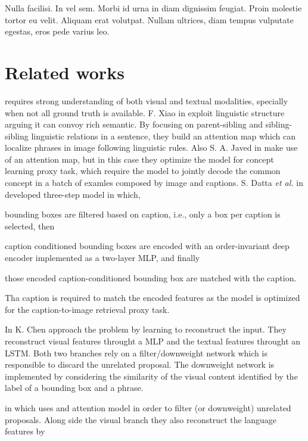 \begin{savequote}[75mm]
Nulla facilisi. In vel sem. Morbi id urna in diam dignissim feugiat. Proin molestie tortor eu velit. Aliquam erat volutpat. Nullam ultrices, diam tempus vulputate egestas, eros pede varius leo.
\end{savequote}

\chapter{Related works}

 requires strong
understanding of both visual and textual modalities, specially when
not all ground truth is available. F. Xiao \etal{} in  exploit linguistic structure arguing it can convoy rich
semantic. By focusing on parent-sibling and sibling-sibling linguistic
relations in a sentence, they build an attention map which can
localize phrases in image following linguistic rules. Also S. A. Javed
\etal{} in  make use of an attention map, but in this
case they optimize the model for concept learning proxy task, which
require the model to jointly decode the common concept in a batch of
examles composed by image and captions. S. Datta \textit{et al.} in
 developed three-step model in which, 
\begin{enumerate*}[label=(\roman*)] 
    \item bounding boxes are filtered based on caption, i.e., only a
    box per caption is selected, then
    \item caption conditioned bounding boxes are encoded with an
    order-invariant deep encoder implemented as a two-layer MLP, and
    finally
    \item those encoded caption-conditioned bounding box are matched
with the caption.
\end{enumerate*}
Tha caption is required to match the encoded features as the model is
optimized for the caption-to-image retrieval proxy task. 

In  K. Chen \etal{} approach the problem by learning to
reconstruct the input. They reconstruct visual features throught a MLP
and the textual features throught an LSTM. Both two branches rely on a
filter/downweight network which is responsible to discard the
unrelated proposal. The downweight network is implemented by
considering the similarity of the visual content identified by the
label of a bounding box and a phrase. 


in which uses and attention model in order to filter (or downweight)
unrelated proposals. Along side the visual branch they also reconstruct the language features by 



